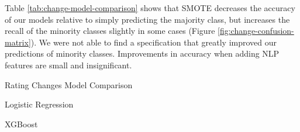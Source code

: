 \documentclass{article}[11pt]
\begin{document}
    Table \ref{tab:change-model-comparison} shows that SMOTE decreases the accuracy of our models relative to simply predicting the majority class, but increases the recall of the minority classes slightly in some cases (Figure \ref{fig:change-confusion-matrix}). We were not able to find a specification that greatly improved our predictions of minority classes. Improvements in accuracy when adding NLP features are small and insignificant.

    \begin{table}[h!]
        \centering
        \caption{Rating Changes Model Comparison}
        \begin{minipage}[c]{0.45\linewidth}
            \centering
            
            \caption*{\footnotesize Logistic Regression} 
        \end{minipage}
        \begin{minipage}[c]{0.45\linewidth}
            \centering
            
            \caption*{\footnotesize XGBoost} 
        \end{minipage}
        \label{tab:change-model-comparison}
    \end{table}
\end{document}
